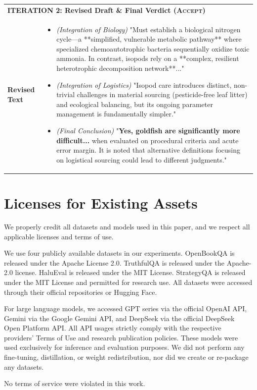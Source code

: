 \documentclass{article}
\begin{document}
\begin{longtable}{p{} p{}}
\multicolumn{2}{l}{\textbf{ITERATION 2: Revised Draft \& Final Verdict (\textsc{Accept})}} \\
\textbf{Revised Text} & 
\begin{itemize}[nosep, leftmargin=1.5em]
    \item \textit{(Integration of Biology)} "Must establish a biological nitrogen cycle—a **simplified, vulnerable metabolic pathway** where specialized chemoautotrophic bacteria sequentially oxidize toxic ammonia. In contrast, isopods rely on a **complex, resilient heterotrophic decomposition network**..."
    \item \textit{(Integration of Logistics)} "Isopod care introduces distinct, non-trivial challenges in material sourcing (pesticide-free leaf litter) and ecological balancing, but its ongoing parameter management is fundamentally simpler."
    \item \textit{(Final Conclusion)} "\textbf{Yes, goldfish are significantly more difficult...} when evaluated on procedural criteria and acute error margin. It is noted that alternative definitions focusing on logistical sourcing could lead to different judgments."
\end{itemize} \\
\end{longtable}

\section{Licenses for Existing Assets}

We properly credit all datasets and models used in this paper, and we respect all applicable licenses and terms of use.

We use four publicly available datasets in our experiments. OpenBookQA is released under the Apache License 2.0. TruthfulQA is released under the Apache-2.0 license. HaluEval is released under the MIT License. StrategyQA is released under the MIT License and permitted for research use. All datasets were accessed through their official repositories or Hugging Face.

For large language models, we accessed GPT series via the official OpenAI API, Gemini via the Google Gemini API, and DeepSeek via the official DeepSeek Open Platform API. All API usages strictly comply with the respective providers' Terms of Use and research publication policies. These models were used exclusively for inference and evaluation purposes. We did not perform any fine-tuning, distillation, or weight redistribution, nor did we create or re-package any datasets.

No terms of service were violated in this work.
\end{document}
